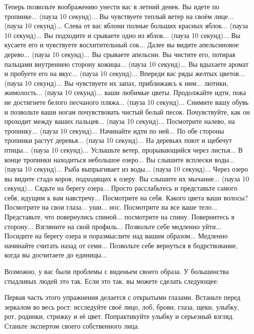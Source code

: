 \documentclass[10pt, fleqn]{article}
\begin{document}
Теперь позвольте воображению унести вас в летний денек. Вы идете по тропинке... (пауза 10 секунд)... Вы чувствуете теплый ветер на своём лице... (пауза 10 секунд)... Слева от вас яблони полные больших красных яблок... (пауза 10 секунд)... Вы подходите и срываете одно из яблок... (пауза 10 секунд)... Вы кусаете его и чувствуете восхитительный сок... Далее вы видите апельсиновое дерево... (пауза 10 секунд)... Вы срываете апельсин. Вы чистите его, потирая пальцами внутреннею сторону кожицы... (пауза 10 секунд)... Вы вдыхаете аромат и пробуете его на вкус... (пауза 10 секунд)... Впереди вас ряды желтых цветов... (пауза 10 секунд)... Вы чувствуете их запах, приближаясь к ним... лютики, жимолость... (пауза 10 секунд)... ваши любимые цветы. Продолжайте идти, пока не достигнете белого песчаного пляжа... (пауза 10 секунд)... Снимите вашу обувь и позвольте ваши ногам почувствовать чистый белый песок. Почувствуйте, как он проходит между ваших пальцев... (пауза 10 секунд)... Посмотрите налево, на тропинку... (пауза 10 секунд)... Начинайте идти по ней... По обе стороны тропинки растут деревья... (пауза 10 секунд)... На деревьях поют и щебечут птицы... (пауза 10 секунд)... Услышьте ветер, прорывающийся через листья... В конце тропинки находиться небольшое озеро... Вы слышите всплески воды... (пауза 10 секунд)... Рыба выпрыгивает из воды... (пауза 10 секунд)... Через озеро вы видите стадо коров, подходящих к озеру. Вы слышите их мычание... (пауза 10 секунд)... Сядьте на берегу озера... Просто расслабьтесь и представьте самого себя, идущим к вам навстречу... Посмотрите на себя. Какого цвета ваши волосы? Посмотрите на свои глаза... уши... нос. Посмотрите на все ваше тело... Представьте, что повернулись спиной... посмотрите на спину. Повернитесь в сторону... Взгляните на свой профиль... Позвольте себе медленно уйти... Посидите на берегу озера и поразмыслите над вашим образом... Медленно начинайте считать назад от семи... Позвольте себе вернуться в бодрствование, когда вы досчитаете до единицы...

Возможно, у вас были проблемы с виденьем своего образа. У большинства стыдливых людей это так. Если это так, вы можете сделать следующее:


Первая часть этого упражнения делается с открытыми глазами. Встаньте перед зеркалом во весь рост: исследуйте своё лицо, лоб, брови, глаза, щеки, улыбку, рот, родинки, стрижку и её цвет. Попрактикуйте улыбку и серьезный взгляд. Станьте экспертом своего собственного лица.
\end{document}
